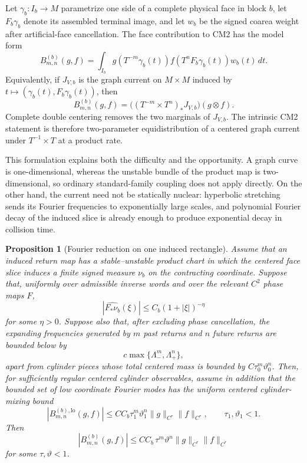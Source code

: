 \documentclass[11pt]{article}
\newtheorem{proposition}[theorem]{Proposition}
\begin{document}
Let $\gamma_b:I_b\to M$ parametrize one side of a complete physical face in
block $b$, let $F_b\gamma_b$ denote its assembled terminal image, and let
$w_b$ be the signed coarea weight after artificial-face cancellation.  The
face contribution to CM2 has the model form
\begin{equation}
\label{eq:dynamic-graph}
 B_{m,n}^{(b)}(g,f)
 =\int_{I_b} g(T^{-m}\gamma_b(t))
                  f(T^nF_b\gamma_b(t))w_b(t)\,dt .
\end{equation}
Equivalently, if $J_{V,b}$ is the graph current on $M\times M$ induced by
$t\mapsto(\gamma_b(t),F_b\gamma_b(t))$, then
\begin{equation}
\label{eq:product-current}
 B_{m,n}^{(b)}(g,f)
 =\bigl((T^{-m}\times T^n)_*J_{V,b}\bigr)(g\otimes f).
\end{equation}
Complete double centering removes the two marginals of $J_{V,b}$.  The
intrinsic CM2 statement is therefore two-parameter equidistribution of a
centered graph current under $T^{-1}\times T$ at a product rate.

This formulation explains both the difficulty and the opportunity.  A graph
curve is one-dimensional, whereas the unstable bundle of the product map is
two-dimensional, so ordinary standard-family coupling does not apply
directly.  On the other hand, the current need not be statically nuclear:
hyperbolic stretching sends its Fourier frequencies to exponentially large
scales, and polynomial Fourier decay of the induced slice is already enough
to produce exponential decay in collision time.

\begin{proposition}[Fourier reduction on one induced rectangle]
\label{prop:fourier-reduction}
Assume that an induced return map has a stable--unstable product chart in
which the centered face slice induces a finite signed measure $\nu_b$ on the
contracting coordinate.  Suppose that, uniformly over admissible inverse
words and over the relevant $C^2$ phase maps $F$,
\begin{equation}
\label{eq:fourier-decay}
 |\widehat{F_*\nu_b}(\xi)|\le C_b(1+|\xi|)^{-\eta}
\end{equation}
for some $\eta>0$.  Suppose also that, after excluding phase cancellation,
the expanding frequencies generated by $m$ past returns and $n$ future
returns are bounded below by
\[
 c\max\{\Lambda_-^m,\Lambda_+^n\},
\]
apart from cylinder pieces whose total centered mass is bounded by
$C\tau_0^m\vartheta_0^n$.  Then, for sufficiently regular
centered cylinder observables, assume in addition that the bounded set of
low coordinate Fourier modes has the uniform centered cylinder-mixing bound
\begin{equation}
\label{eq:fourier-reduction-low-mode-input}
 |B_{m,n}^{(b),\mathrm{lo}}(g,f)|
 \le C C_b\tau_1^m\vartheta_1^n
       \|g\|_{C^r}\|f\|_{C^r},
 \qquad \tau_1,\vartheta_1<1.
\end{equation}
Then
\begin{equation}
 |B_{m,n}^{(b)}(g,f)|
 \le C C_b\,\tau^m\vartheta^n\|g\|_{C^r}\|f\|_{C^r}
\end{equation}
for some $\tau,\vartheta<1$.
\end{proposition}
\end{document}
